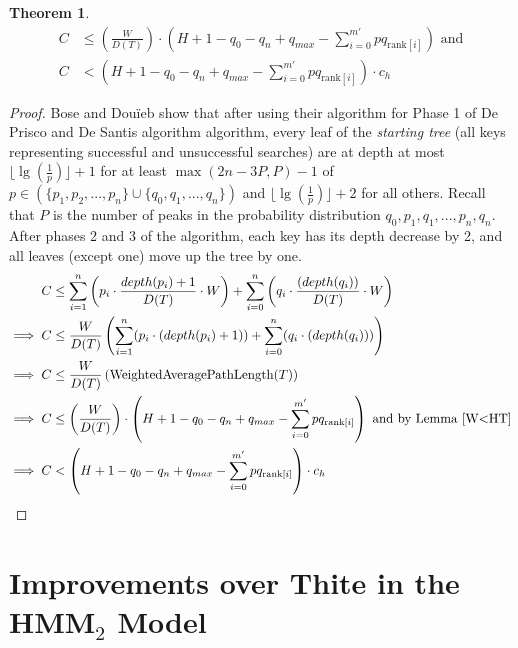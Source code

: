 \documentclass[letterpaper,12pt,titlepage,oneside,final]{book}
\theoremstyle{plain}
\newtheorem{thm}{Theorem}[section]
\begin{document}
\begin{thm} \label{ApproxBSTThm}
\begin{align*}
C &\leq  (\frac{W}{D(T)}) \cdot  (H + 1 - q_0 - q_n + q_{max} - \sum_{i=0}^{m'} pq_{\text{rank}[i]}) \text{ and} \\
C &<  (H + 1 - q_0 - q_n + q_{max} - \sum_{i=0}^{m'} pq_{\text{rank}[i]})\cdot c_h
\end{align*}
\end{thm}

\begin{proof}

Bose and Dou\"{i}eb show that after using their algorithm for Phase 1 of De Prisco and De Santis algorithm algorithm, every leaf of the \textit{starting tree} (all keys representing successful and unsuccessful searches) are at depth at most $\lfloor \lg(\frac{1}{p}) \rfloor + 1$  for at least $\max(2n-3P,P)-1$ of $p \in \left( \{p_1, p_2, ..., p_n \} \cup \{ q_0, q_1, ..., q_n \} \right)$ and $\lfloor \lg(\frac{1}{p}) \rfloor + 2$ for all others. Recall that $P$ is the number of peaks in the probability distribution $q_0, p_1, q_1, ..., p_n, q_n$. After phases 2 and 3 of the algorithm, each key has its depth decrease by 2, and all leaves (except one) move up the tree by one.
\begin{align*}
C &\leq \sum_{i=1}^{n} \left(p_i\cdot \frac{depth(p_i)+1}{D(T)}\cdot  W \right)+ \sum_{i=0}^{n} \left(q_i\cdot \frac{(depth(q_i))}{D(T)}\cdot  W \right) \\
\implies C &\leq \frac{W}{D(T)} \left(\sum_{i=1}^{n}(p_i\cdot (depth(p_i)+1))+ \sum_{i=0}^{n}(q_i\cdot (depth(q_i))) \right) \\
\implies C &\leq \frac{W}{D(T)} \left(\text{WeightedAveragePathLength}(T) \right) \\
\implies C &\leq  \left( \frac{W}{D(T)} \right) \cdot  \left(H + 1 - q_0 - q_n + q_{max} - \sum_{i=0}^{m'} pq_{\text{rank}[i]} \right) \text{ and by Lemma~\ref{W<HT}} \\
\implies C &<  \left(H + 1 - q_0 - q_n + q_{max} - \sum_{i=0}^{m'} pq_{\text{rank}[i]} \right)\cdot c_h
\end{align*}

\end{proof}


\section{Improvements over Thite in the HMM$_2$ Model}
\end{document}
